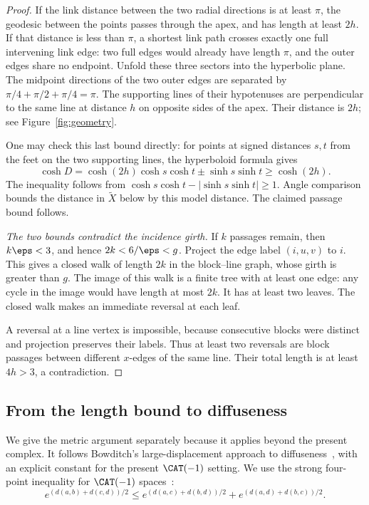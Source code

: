 \begin{proof}
If the link distance between the two radial directions is at least
\(\pi\), the geodesic between the points passes through the apex,
and has length at least \(2h\). If that distance is less than \(\pi\),
a shortest link path crosses exactly one full intervening link edge:
two full edges would already have length \(\pi\), and the outer
edges share no endpoint. Unfold these three sectors into the
hyperbolic plane. The midpoint directions of the two outer edges
are separated by
\(\pi/4+\pi/2+\pi/4=\pi\).
The supporting lines of their hypotenuses are perpendicular to the
same line at distance \(h\) on opposite sides of the apex. Their
distance is \(2h\); see Figure~\ref{fig:geometry}.

One may check this last bound directly: for points at signed
distances \(s,t\) from the feet on the two supporting lines,
the hyperboloid formula gives
\[
 \cosh D=\cosh(2h)\cosh s\cosh t
                 \mathbin{\pm}\sinh s\sinh t
 \ge\cosh(2h).
\]
The inequality follows from
\(\cosh s\cosh t-|\sinh s\sinh t|\ge1\).
Angle comparison bounds the distance in \(\widetilde X\) below by
this model distance. The claimed passage bound follows.

\smallskip\noindent
\emph{The two bounds contradict the incidence girth.}
If \(k\) passages remain, then \(k\eps<3\), and hence
\(2k<6/\eps<g\). Project the edge label \((i,u,v)\) to \(i\).
This gives a closed walk of length \(2k\) in the block--line graph,
whose girth is greater than \(g\). The image of this walk is a finite
tree with at least one edge: any cycle in the image would have length
at most \(2k\). It has at least two leaves. The closed walk makes an
immediate reversal at each leaf.

A reversal at a line vertex is impossible, because consecutive
blocks were distinct and projection preserves their labels.
Thus at least two reversals are block passages between different
\(x\)-edges of the same line. Their total length is at least
\(4h>3\), a contradiction.
\end{proof}

\subsection{From the length bound to diffuseness}

We give the metric argument separately because it applies beyond
the present complex. It follows Bowditch's large-displacement approach
to diffuseness~\cite[Section~5]{Bowditch}, with an explicit constant
for the present \(\CAT(-1)\) setting. We use the strong four-point inequality for
\(\CAT(-1)\) spaces~\cite[Definition~4.1 and Theorem~5.1]{NicaSpakula}:
\begin{equation}\label{eq:four-point}
 e^{(d(a,b)+d(c,d))/2}
 \le e^{(d(a,c)+d(b,d))/2}+e^{(d(a,d)+d(b,c))/2}.
\end{equation}


